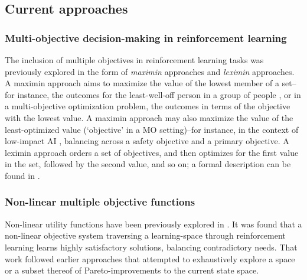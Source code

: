 \subsection{Current approaches}

\subsubsection{Multi-objective decision-making in reinforcement learning}
The inclusion of multiple objectives in reinforcement learning tasks was previously explored \cite{vamplew_human-aligned_2018,vamplew_potential-based_2021}  in the form of  \textit{maximin} approaches and \textit{leximin} approaches.
A maximin approach aims to maximize the value of the lowest member of a set--for instance, the outcomes for the least-well-off person in a group of people \cite{rawls2001justice}, or in a multi-objective optimization problem, the outcomes in terms of the objective with the lowest value. A maximin approach may also maximize the value of the least-optimized value (`objective' in a MO setting)--for instance, in the context of low-impact AI \cite{vamplew_potential-based_2021}, balancing across a safety objective
and a primary objective. A leximin approach orders a set of objectives, and then optimizes for the first value in the set, followed by the second value, and so on; a formal description can be found in \cite{vamplew_human-aligned_2018}.

\subsubsection{Non-linear multiple objective functions}
Non-linear utility functions have been previously explored in \cite{rolf_need_2020}. It was found that a non-linear objective system traversing a learning-space through reinforcement learning learns highly satisfactory solutions, balancing contradictory needs. That work followed earlier approaches that attempted to exhaustively explore \cite{van2014multi,parisi2016multi} a space or a subset thereof \cite{barrett2008learning} of Pareto-improvements to the current state space.

